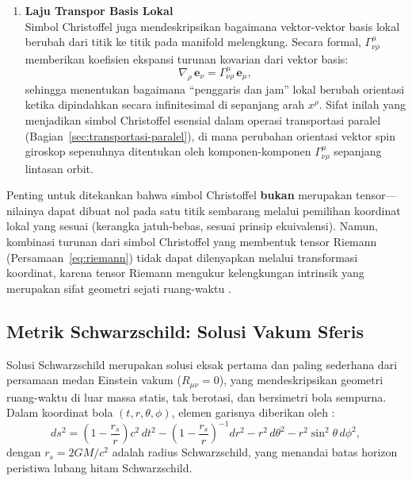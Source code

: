 \begin{enumerate}[label=(\alph*), wide=0pt, leftmargin=*]
    \item \textbf{Laju Transpor Basis Lokal}\\
    Simbol Christoffel juga mendeskripsikan bagaimana vektor-vektor basis lokal berubah dari titik ke titik pada manifold melengkung. Secara formal, $\Gamma^\mu_{\nu\rho}$ memberikan koefisien ekspansi turunan kovarian dari vektor basis:
    \begin{equation}
        \nabla_\rho\, \mathbf{e}_\nu = \Gamma^\mu_{\nu\rho}\, \mathbf{e}_\mu,
        \label{eq:christoffel-basis-transport}
    \end{equation}
    sehingga menentukan bagaimana ``penggaris dan jam'' lokal berubah orientasi ketika dipindahkan secara infinitesimal di sepanjang arah $x^\rho$. Sifat inilah yang menjadikan simbol Christoffel esensial dalam operasi transportasi paralel (Bagian~\ref{sec:transportasi-paralel}), di mana perubahan orientasi vektor spin giroskop sepenuhnya ditentukan oleh komponen-komponen $\Gamma^\mu_{\nu\rho}$ sepanjang lintasan orbit.
\end{enumerate}

Penting untuk ditekankan bahwa simbol Christoffel \textbf{bukan} merupakan tensor---nilainya dapat dibuat nol pada satu titik sembarang melalui pemilihan koordinat lokal yang sesuai (kerangka jatuh-bebas, sesuai prinsip ekuivalensi). Namun, kombinasi turunan dari simbol Christoffel yang membentuk tensor Riemann (Persamaan~\ref{eq:riemann}) tidak dapat dilenyapkan melalui transformasi koordinat, karena tensor Riemann mengukur kelengkungan intrinsik yang merupakan sifat geometri sejati ruang-waktu \parencite{Misner1973Gravitation, Carroll2004SpacetimeGeometry}.


\subsection{Metrik Schwarzschild: Solusi Vakum Sferis}
\label{subsec:metrik-schwarzschild}

Solusi Schwarzschild merupakan solusi eksak pertama dan paling sederhana dari persamaan medan Einstein vakum ($R_{\mu\nu} = 0$), yang mendeskripsikan geometri ruang-waktu di luar massa statis, tak berotasi, dan bersimetri bola sempurna. Dalam koordinat bola $(t, r, \theta, \phi)$, elemen garisnya diberikan oleh \parencite{Schwarzschild1916Field}:
\begin{equation}
    ds^2 = \left(1 - \frac{r_s}{r}\right) c^2\,dt^2
         - \left(1 - \frac{r_s}{r}\right)^{-1} dr^2
         - r^2\, d\theta^2
         - r^2 \sin^2\!\theta\, d\phi^2,
    \label{eq:schwarzschild}
\end{equation}
dengan $r_s = 2GM/c^2$ adalah radius Schwarzschild, yang menandai batas horizon peristiwa lubang hitam Schwarzschild.

